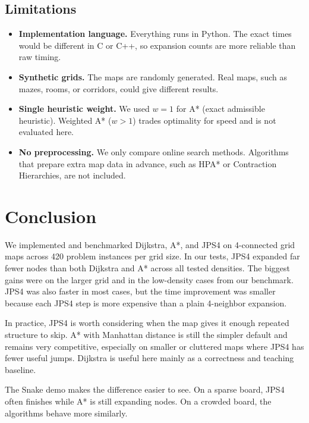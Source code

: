 \documentclass[11pt,a4paper]{article}
\begin{document}
\subsection{Limitations}

\begin{itemize}[nosep]
  \item \textbf{Implementation language.} Everything runs in Python. The exact times would be different in C or C++, so expansion counts are more reliable than raw timing.
  \item \textbf{Synthetic grids.} The maps are randomly generated. Real maps, such as mazes, rooms, or corridors, could give different results.
  \item \textbf{Single heuristic weight.} We used $w = 1$ for A* (exact admissible heuristic). Weighted A* ($w > 1$) trades optimality for speed and is not evaluated here.
  \item \textbf{No preprocessing.} We only compare online search methods. Algorithms that prepare extra map data in advance, such as HPA* or Contraction Hierarchies, are not included.
\end{itemize}

\section{Conclusion}

We implemented and benchmarked Dijkstra, A*, and JPS4 on 4-connected grid maps across 420 problem instances per grid size. In our tests, JPS4 expanded far fewer nodes than both Dijkstra and A* across all tested densities. The biggest gains were on the larger grid and in the low-density cases from our benchmark. JPS4 was also faster in most cases, but the time improvement was smaller because each JPS4 step is more expensive than a plain 4-neighbor expansion.

In practice, JPS4 is worth considering when the map gives it enough repeated structure to skip. A* with Manhattan distance is still the simpler default and remains very competitive, especially on smaller or cluttered maps where JPS4 has fewer useful jumps. Dijkstra is useful here mainly as a correctness and teaching baseline.

The Snake demo makes the difference easier to see. On a sparse board, JPS4 often finishes while A* is still expanding nodes. On a crowded board, the algorithms behave more similarly.
\end{document}
